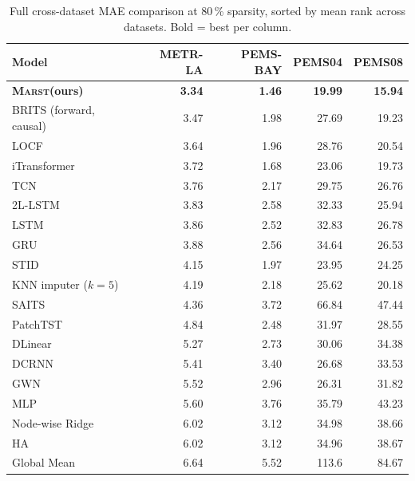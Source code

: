 \documentclass[11pt]{article}
\newcommand{\MARST}{\textsc{Marst}\xspace}
\begin{document}
\begin{table}[!htbp]
\centering
\caption{Full cross-dataset MAE comparison at 80\,\% sparsity, sorted
by mean rank across datasets.  Bold = best per column.}
\label{tab:cross-dataset}
\small
\begin{tabular}{lrrrr}
\toprule
\textbf{Model} & \textbf{METR-LA} & \textbf{PEMS-BAY} & \textbf{PEMS04} & \textbf{PEMS08} \\
\midrule
\textbf{\MARST (ours)}        & \textbf{3.34}  & \textbf{1.46}  & \textbf{19.99} & \textbf{15.94} \\
BRITS (forward, causal)        & 3.47          & 1.98           & 27.69          & 19.23 \\
LOCF                           & 3.64          & 1.96           & 28.76          & 20.54 \\
iTransformer                   & 3.72          & 1.68           & 23.06          & 19.73 \\
TCN                            & 3.76          & 2.17           & 29.75          & 26.76 \\
2L-LSTM                        & 3.83          & 2.58           & 32.33          & 25.94 \\
LSTM                           & 3.86          & 2.52           & 32.83          & 26.78 \\
GRU                            & 3.88          & 2.56           & 34.64          & 26.53 \\
STID                           & 4.15          & 1.97           & 23.95          & 24.25 \\
KNN imputer ($k=5$)           & 4.19          & 2.18           & 25.62          & 20.18 \\
SAITS                          & 4.36          & 3.72           & 66.84          & 47.44 \\
PatchTST                       & 4.84          & 2.48           & 31.97          & 28.55 \\
DLinear                        & 5.27          & 2.73           & 30.06          & 34.38 \\
DCRNN                          & 5.41          & 3.40           & 26.68          & 33.53 \\
GWN                            & 5.52          & 2.96           & 26.31          & 31.82 \\
MLP                            & 5.60          & 3.76           & 35.79          & 43.23 \\
Node-wise Ridge                & 6.02          & 3.12           & 34.98          & 38.66 \\
HA                             & 6.02          & 3.12           & 34.96          & 38.67 \\
Global Mean                    & 6.64          & 5.52           & 113.6          & 84.67 \\
\bottomrule
\end{tabular}
\end{table}
\end{document}
